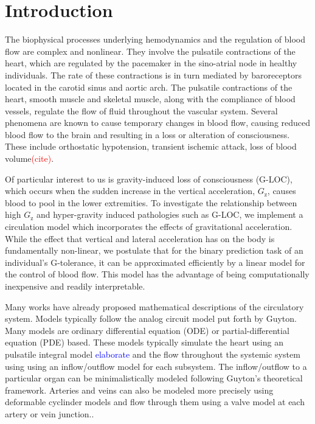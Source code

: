 \documentclass[12pt]{article}
\begin{document}
\section{Introduction}
The biophysical processes underlying hemodynamics and the regulation of blood flow are complex and nonlinear. They involve the pulsatile contractions of the heart, which are regulated by the pacemaker in the sino-atrial node in healthy individuals. The rate of these contractions is in turn mediated by baroreceptors located in the carotid sinus and aortic arch. The pulsatile contractions of the heart, smooth muscle and skeletal muscle, along with the compliance of blood vessels, regulate the flow of fluid throughout the vascular system. Several phenomena are known to cause temporary changes in blood flow, causing reduced blood flow to the brain and resulting in a loss or alteration of consciousness. These include orthostatic hypotension,  transient ischemic attack, loss of blood volume\textcolor{red}{(cite)}. 
\par Of particular interest to us is gravity-induced loss of consciousness (G-LOC), which occurs when the sudden increase in the vertical acceleration, $G_{\text{z}}$, causes blood to pool in the lower extremities. To investigate the relationship between high $G_\text{z}$ and hyper-gravity induced pathologies such as G-LOC, we implement a circulation model which incorporates the effects of gravitational acceleration. While the effect that vertical and lateral acceleration has on the body is fundamentally non-linear, we postulate that for the binary prediction task of an individual's G-tolerance, it can be approximated efficiently by a linear model for the control of blood flow. This model has the advantage of being computationally inexpensive and readily interpretable.
\par Many works have already proposed mathematical descriptions of the circulatory system. Models typically follow the analog circuit model put forth by Guyton. Many models are ordinary differential equation (ODE) or partial-differential equation (PDE) based. These models typically simulate the heart using an pulsatile integral model \textcolor{blue}{elaborate} and the flow throughout the systemic system using using an inflow/outflow model for each subsystem. The inflow/outflow to a particular organ can be minimalistically modeled \cite{diaz2019computational} following Guyton's theoretical framework. Arteries and veins can also be modeled more precisely using deformable cyclinder models and flow through them using a valve model at each artery or vein junction.\cite{zhang2017gravitational}.
\end{document}
